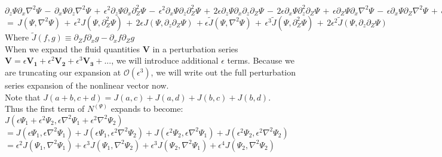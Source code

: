 \documentclass[letterpaper,12pt]{article}
\begin{document}
$\partial_z\Psi\partial_x\nabla^2\Psi \, - \, \partial_x\Psi\partial_z\nabla^2\Psi \, + \, \epsilon^2\partial_z\Psi\partial_x\partial_Z^2\Psi \, - \, \epsilon^2\partial_x\Psi\partial_z\partial_Z^2\Psi \, + \, 2\epsilon\partial_z\Psi\partial_x\partial_z\partial_Z\Psi \, - \, 2\epsilon\partial_x\Psi\partial_z^2\partial_Z\Psi \, + \, \epsilon\partial_Z\Psi\partial_x\nabla^2\Psi \, - \, \epsilon\partial_x\Psi\partial_Z\nabla^2\Psi \, + \, \epsilon^3\partial_Z\Psi\partial_x\partial_Z^2\Psi \, - \, \epsilon^3\partial_x\Psi\partial_Z^3\Psi \, + \, 2\epsilon^2\partial_Z\Psi\partial_x\partial_z\partial_Z\Psi \, - \, 2\epsilon^2\partial_x\Psi\partial_z\partial_Z^2\Psi$ \\

$= \, J\left(\Psi, \nabla^2\Psi\right) \, + \, \epsilon^2J\left(\Psi, \partial_Z^2\Psi\right) \, + \, 2\epsilon J\left(\Psi, \partial_z\partial_Z\Psi\right) \, + \epsilon\widetilde{J}\left(\Psi, \nabla^2\Psi\right) \, + \, \epsilon^3\widetilde{J}\left(\Psi, \partial_Z^2\Psi\right) \, + \, 2\epsilon^2\widetilde{J}\left(\Psi, \partial_z\partial_Z\Psi\right)$ \\

Where $\widetilde{J}\left(f, g\right) \equiv \partial_Z f \partial_x g - \partial_x f \partial_Z g$ \\

When we expand the fluid quantities $\mathbf{V}$ in a perturbation series $\mathbf{V} = \epsilon\mathbf{V_1} + \epsilon^2\mathbf{V_2} + \epsilon^3\mathbf{V_3} + ...$, we will introduce additional $\epsilon$ terms. Because we are truncating our expansion at $\mathcal{O}(\epsilon^3)$, we will write out the full perturbation series expansion of the nonlinear vector now. \\

Note that $J\left(a + b, c + d\right) = J(a, c) + J(a, d) + J(b, c) + J(b, d)$. \\

Thus the first term of $N^{\left(\Psi\right)}$ expands to become: \\

$J(\epsilon\Psi_1 + \epsilon^2\Psi_2, \epsilon\nabla^2 \Psi_1 + \epsilon^2 \nabla^2\Psi_2)$ \\

$= J(\epsilon\Psi_1, \epsilon\nabla^2\Psi_1) + J(\epsilon\Psi_1, \epsilon^2\nabla^2\Psi_2) + J(\epsilon^2\Psi_2, \epsilon\nabla^2\Psi_1) + J(\epsilon^2\Psi_2, \epsilon^2\nabla^2\Psi_2)$ \\

$= \epsilon^2 J(\Psi_1, \nabla^2\Psi_1) + \epsilon^3J(\Psi_1, \nabla^2\Psi_2) + \epsilon^3J(\Psi_2, \nabla^2\Psi_1) + \epsilon^4J(\Psi_2, \nabla^2\Psi_2)$ \\
\end{document}
